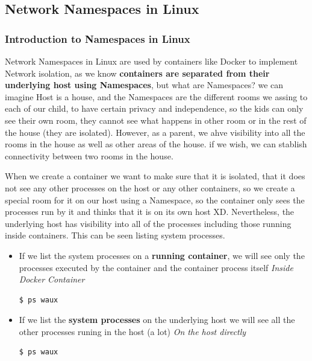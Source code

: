 \documentclass{article}
\newenvironment{codetemplate}[1][]{%
  \mybasecolorbox[#1]
  \itshape
}{%
  \endmybasecolorbox
}
\begin{document}
\subsection{Network Namespaces in Linux}

\subsubsection{Introduction to Namespaces in Linux}

Network Namespaces in Linux are used by containers like Docker to implement Network isolation, as we know \textbf{containers are separated from their underlying host using Namespaces}, but what are Namespaces? we can imagine Host is a house, and the Namespaces are the different rooms we assing to each of our child, to have certain privacy and independence, so the kids can only see their own room, they cannot see what happens in other room or in the rest of the house (they are isolated). However, as a parent, we ahve visibility into all the rooms in the house as well as other areas of the house. if we wish, we can stablish connectivity between two rooms in the house.

When we create a container we want to make sure that it is isolated, that it does not see any other processes on the host or any other containers, so we create a special room for it on our host using a Namespace, so the container only sees the processes run by it and thinks that it is on its own host XD. Nevertheless, the underlying host has visibility into all of the processes including those running inside containers. This can be seen listing system processes.

\begin{itemize}
    \item If we list the system processes on a \textbf{running container}, we will see only the processes executed by the container and the container process itself
\begin{codetemplate}{Inside Docker Container}
\begin{verbatim}
$ ps waux
\end{verbatim}
\end{codetemplate}

    \item If we list the \textbf{system processes} on the underlying host we will see all the other processes runing in the host (a lot)
\begin{codetemplate}{On the host directly}
\begin{verbatim}
$ ps waux
\end{verbatim}
\end{codetemplate}
\end{itemize}
\end{document}
